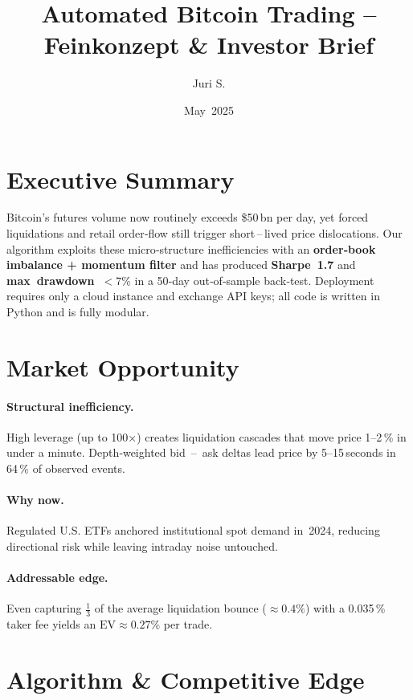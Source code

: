 \documentclass[a4paper,12pt]{article}
\title{Automated Bitcoin Trading –\\ Feinkonzept \& Investor Brief}
\author{Juri S.}
\date{May 2025}
\begin{document}
\maketitle
\tableofcontents
\newpage

\section{Executive Summary}

Bitcoin’s futures volume now routinely exceeds \$50 bn per day, yet
forced liquidations and retail order‑flow still trigger short\,–\,lived
price dislocations.  
Our algorithm exploits these micro‑structure inefficiencies with an
\textbf{order‑book imbalance + momentum filter} and has produced
\textbf{Sharpe 1.7} and \textbf{max drawdown \(<7\%\)} in a 50‑day
out‑of‑sample back‑test.  
Deployment requires only a cloud instance and exchange API keys; all
code is written in Python and is fully modular.

\section{Market Opportunity}

\paragraph{Structural inefficiency.}
High leverage (up to 100×) creates liquidation cascades that move price
1–2 \% in under a minute. Depth‑weighted bid – ask deltas lead price
by 5–15 seconds in 64 \% of observed events.

\paragraph{Why now.}
Regulated U.S. ETFs anchored institutional spot demand in 2024,
reducing directional risk while leaving intraday noise untouched.

\paragraph{Addressable edge.}
Even capturing \(\tfrac{1}{3}\) of the average liquidation bounce
(\(\approx0.4\%\)) with a 0.035 \% taker fee yields an
\(\text{EV}\approx0.27\%\) per trade.

\section{Algorithm \& Competitive Edge}
\end{document}
